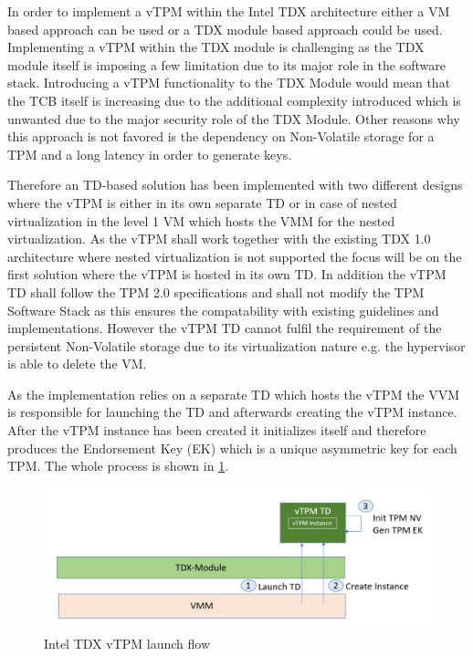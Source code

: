 \documentclass[sigplan,screen,nonacm]{acmart}
\begin{document}
In order to implement a vTPM within the Intel TDX architecture either a VM based approach can be used or a TDX module based approach could be used.
Implementing a vTPM within the TDX module is challenging as the TDX module itself is imposing a few limitation due to its major role in the software stack.
Introducing a vTPM functionality to the TDX Module would mean that the TCB itself is increasing due to the additional complexity introduced which is unwanted due to the major security role of the TDX Module\cite[p. 4]{Intel-vTPM}.
Other reasons why this approach is not favored is the dependency on Non-Volatile storage for a TPM and a long latency in order to generate keys\cite[p. 4]{Intel-vTPM}.

Therefore an TD-based solution has been implemented with two different designs where the vTPM is either in its own separate TD or in case of nested virtualization in the level 1 VM which hosts the VMM for the nested virtualization.
As the vTPM shall work together with the existing TDX 1.0 architecture where nested virtualization is not supported the focus will be on the first solution where the vTPM is hosted in its own TD\cite[p. 5]{Intel-vTPM}.
In addition the vTPM TD shall follow the TPM 2.0 specifications and shall not modify the TPM Software Stack as this ensures the compatability with existing guidelines and implementations\cite[p. 5]{Intel-vTPM}.
However the vTPM TD cannot fulfil the requirement of the persistent Non-Volatile storage due to its virtualization nature e.g. the hypervisor is able to delete the VM.

As the implementation relies on a separate TD which hosts the vTPM the VVM is responsible for launching the TD and afterwards creating the vTPM instance.
After the vTPM instance has been created it initializes itself and therefore produces the Endorsement Key (EK) which is a unique asymmetric key for each TPM.
The whole process is shown in \cref{fig:vtpmlaunch}.

\begin{figure}
  \centering
  \includegraphics[width=\linewidth]{pictures/vTPM_launch.png}
  \caption{Intel TDX vTPM launch flow \cite{Intel-vTPM}}
  \label{fig:vtpmlaunch}
\end{figure}
\end{document}

